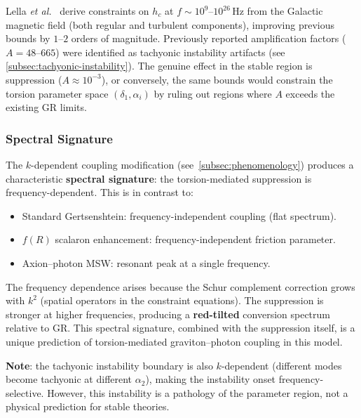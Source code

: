 Lella \emph{et al.}~\cite{lella2024constraining} derive constraints on $h_c$ at $f \sim 10^{9}$--$10^{26}\,\text{Hz}$ from the Galactic magnetic field (both regular and turbulent components), improving previous bounds by $1$--$2$ orders of magnitude. Previously reported amplification factors ($A = 48$--$665$) were identified as tachyonic instability artifacts (see \cref{subsec:tachyonic-instability}). The genuine effect in the stable region is suppression ($A \approx 10^{-3}$), or conversely, the same bounds would constrain the torsion parameter space $(\delta_1, \alpha_i)$ by ruling out regions where $A$ exceeds the existing GR limits.

\subsubsection{Spectral Signature}

The $k$-dependent coupling modification (see~\cref{subsec:phenomenology}) produces a characteristic \textbf{spectral signature}: the torsion-mediated suppression is frequency-dependent. This is in contrast to:
\begin{itemize}
  \item Standard Gertsenshtein: frequency-independent coupling (flat spectrum).
  \item $f(R)$ scalaron enhancement: frequency-independent friction parameter.
  \item Axion--photon MSW: resonant peak at a single frequency.
\end{itemize}
The frequency dependence arises because the Schur complement correction grows with $k^2$ (spatial operators in the constraint equations). The suppression is stronger at higher frequencies, producing a \textbf{red-tilted} conversion spectrum relative to GR. This spectral signature, combined with the suppression itself, is a unique prediction of torsion-mediated graviton--photon coupling in this model.

\textbf{Note}: the tachyonic instability boundary is also $k$-dependent (different modes become tachyonic at different $\alpha_2$), making the instability onset frequency-selective. However, this instability is a pathology of the parameter region, not a physical prediction for stable theories.
